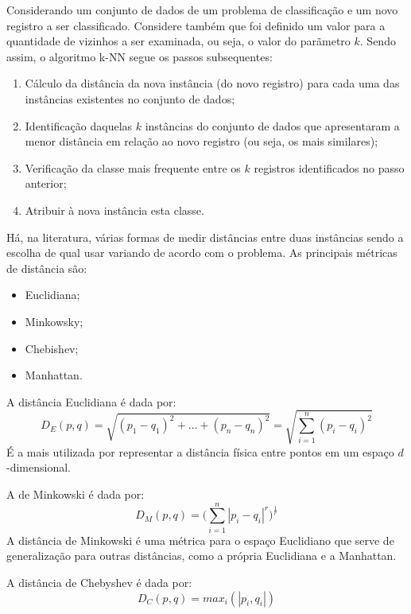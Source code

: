 Considerando um conjunto de dados de um problema de classificação e um novo registro a ser classificado. Considere também que foi definido um valor para a quantidade de vizinhos a ser examinada, ou seja, o valor do parãmetro $ k $. Sendo assim, o algoritmo k-NN segue os passos subsequentes:
\begin{enumerate}
	\item Cálculo da distância da nova instância (do novo registro) para cada uma das instâncias existentes no conjunto de dados;
	\item Identificação daquelas $k$ instâncias do conjunto de dados que apresentaram a menor distância em relação ao novo registro (ou seja, os mais similares);
	\item Verificação da classe mais frequente entre os $ k $ registros identificados no passo anterior;
	\item Atribuir à nova instância esta classe.
\end{enumerate}

Há, na literatura, várias formas de medir distâncias entre duas instâncias sendo a escolha de qual usar variando de acordo com o problema. As principais métricas de distância são: \cite{Boscarioli2017} \cite{alpaydin_introduction_2014} \cite{classification2013}
\begin{itemize}
	\item Euclidiana;
	\item Minkowsky;
	\item Chebishev;
	\item Manhattan.
\end{itemize}

A distância Euclidiana é dada por:
\begin{equation}\label{eq:euclidiana}
D_E(p,q) = \sqrt{(p_1 - q_1)^2 + \dots + (p_n - q_n)^2} = \sqrt{\sum_{i=1}^n (p_i - q_i)^2}
\end{equation}
É a mais utilizada por representar a distância física entre pontos em um espaço $d$-dimensional.

A de Minkowski é dada por:
\begin{equation}\label{eq:minkowiski}
D_M(p,q) =  \Big(\sum_{i=1}^n |p_i-q_i|^r \Big) ^\frac{1}{r}
\end{equation}
A distância de Minkowski é uma métrica para o espaço Euclidiano que serve de generalização para outras distâncias, como a própria Euclidiana e a Manhattan. 

A distância de Chebyshev é dada por:
\begin{equation}\label{eq:chebyshev}
D_C(p,q) = max_i(|p_i, q_i|)
\end{equation}

